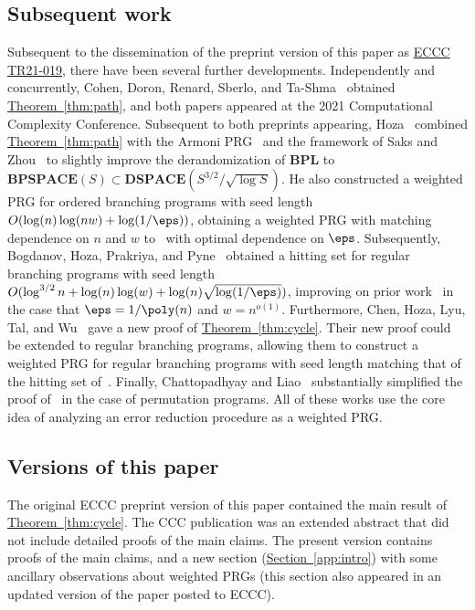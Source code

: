 \documentclass[11pt]{article}
\newcommand{\expref}[2]{\texorpdfstring{\hyperref[#2]{#1~\ref{#2}}}{#1~\ref{#2}}}
\begin{document}
\subsection{Subsequent work}
Subsequent to the dissemination of the preprint version of this %
paper %
%
%
%
%
%
%
as \href{https://eccc.weizmann.ac.il/report/2021/019/}{ECCC TR21-019},
there have been several further developments. Independently and concurrently, Cohen, Doron, Renard, Sberlo, and Ta-Shma~\cite{CohenDoReSbTa21} obtained \expref{Theorem}{thm:path}, and both papers appeared at the 2021 Computational Complexity Conference. 
%
Subsequent to both preprints appearing, Hoza~\cite{Hoza21} combined \expref{Theorem}{thm:path} with the Armoni PRG~\cite{Armoni98} and the framework of Saks and Zhou~\cite{SaksZh99} to slightly improve the derandomization of $\mathbf{BPL}$ to %
$\mathbf{BPSPACE}(S)\subset \mathbf{DSPACE}(S^{3/2}/\sqrt{\log S})$. %
He also constructed a weighted PRG for ordered branching programs with seed length $O(\log(n)\log(nw)+\log(1/\eps))$, obtaining a weighted PRG with matching dependence on $n$ and $w$ to~\cite{Nisan92} with optimal dependence on $\eps$. 
%
%
Subsequently, 
%
Bogdanov, Hoza, Prakriya, and Pyne~\cite{BHPP22} obtained a hitting set for regular branching programs with seed length $O(\log^{3/2}n+\log(n)\log(w)+\log(n)\sqrt{\log(1/\eps)})$, improving on prior work~\cite{BravermanRaRaYe10} in the case that $\eps=1/\poly(n)$ and $w=n^{o(1)}$. %
%
Furthermore, Chen, Hoza, Lyu, Tal, and Wu~\cite{CHLTW23} gave a new proof of \expref{Theorem}{thm:cycle}. Their new proof could be extended to regular branching programs, allowing them to construct a weighted PRG for regular branching programs with seed length matching that of the hitting set of~\cite{BHPP22}. Finally, Chattopadhyay and Liao~\cite{CL24} substantially simplified the proof of~\cite{CHLTW23} in the case of permutation programs. All of these works use the core idea of analyzing an error reduction procedure as a weighted PRG.

\subsection{Versions of this paper}
The original ECCC preprint version of this paper contained the main result of \expref{Theorem}{thm:cycle}. The CCC publication was an extended abstract that did not include detailed proofs of the main claims. The present version contains proofs of the main claims, and a new section (\expref{Section}{app:intro}) with some ancillary observations about weighted PRGs (this section also appeared in an updated version of the paper posted to ECCC).
%
\end{document}

